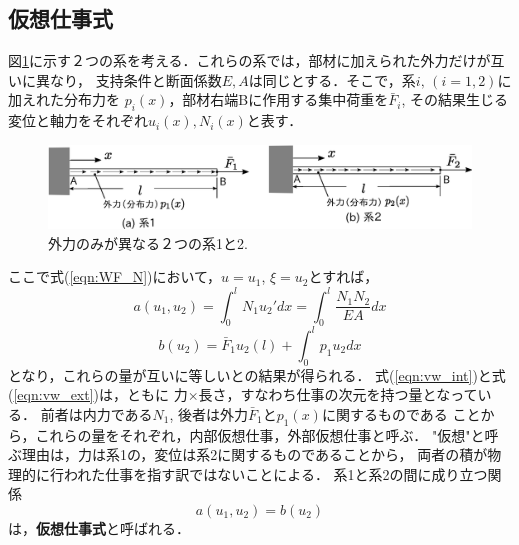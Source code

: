 \documentclass[10pt,a4j]{jarticle}
\begin{document}
\subsection{仮想仕事式}
図\ref{fig:fig1_2}に示す２つの系を考える．これらの系では，部材に加えられた外力だけが互いに異なり，
支持条件と断面係数$E,A$は同じとする．そこで，系$i,\, (i=1,2)$に加えれた分布力を
$p_i(x)$，部材右端Bに作用する集中荷重を$\bar F_i$, その結果生じる変位と軸力をそれぞれ$u_i(x), N_i(x)$と表す．
\begin{figure}[h]
	\begin{center}
	\includegraphics[width=0.8\linewidth]{fig1_2.eps} 
	\end{center}
	\caption{外力のみが異なる２つの系1と2.} 
	\label{fig:fig1_2}
\end{figure}
ここで式(\ref{eqn:WF_N})において，$u=u_1$, $\xi=u_2$とすれば，
\begin{equation}
	a(u_1,u_2)=\int_0^l N_1u_2'dx = \int_0^l\frac{N_1N_2}{EA}dx
	\label{eqn:vw_int}
\end{equation}
\begin{equation}
	b(u_2)=\bar F_1 u_2(l)+\int_0^l p_1 u_2dx
	\label{eqn:vw_ext}
\end{equation}
となり，これらの量が互いに等しいとの結果が得られる．
式(\ref{eqn:vw_int})と式(\ref{eqn:vw_ext})は，ともに
力$\times$長さ，すなわち仕事の次元を持つ量となっている．
前者は内力である$N_1$, 後者は外力$\bar F_1$と$p_1(x)$に関するものである
ことから，これらの量をそれぞれ，内部仮想仕事，外部仮想仕事と呼ぶ．
"仮想"と呼ぶ理由は，力は系1の，変位は系2に関するものであることから，
両者の積が物理的に行われた仕事を指す訳ではないことによる．
系1と系2の間に成り立つ関係
\begin{equation}
	a(u_1,u_2)=b(u_2)
	\label{eqn:vw_eq}
\end{equation}
は，{\bf 仮想仕事式}と呼ばれる．
\end{document}
